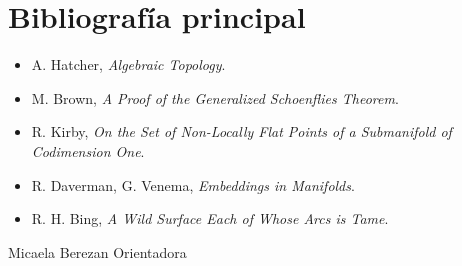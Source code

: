 \documentclass[11pt]{article}
\begin{document}
\section*{Bibliografía principal}

\begin{itemize}
    \item A. Hatcher, \emph{Algebraic Topology}.
    \item M. Brown, \emph{A Proof of the Generalized Schoenflies Theorem}.
    \item R. Kirby, \emph{On the Set of Non-Locally Flat Points of a Submanifold of Codimension One}.
    \item R. Daverman, G. Venema, \emph{Embeddings in Manifolds}.
    \item R. H. Bing, \emph{A Wild Surface Each of Whose Arcs is Tame}.
\end{itemize}

\vspace{2cm}

\begin{flushright}
Micaela Berezan \hfill Orientadora 
\end{flushright}
\end{document}
